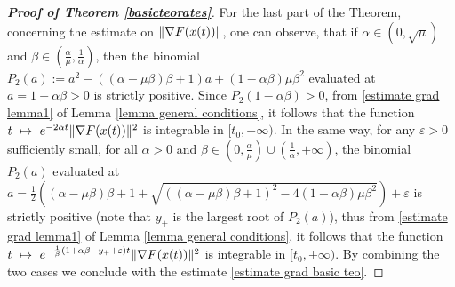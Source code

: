 \documentclass[reqno]{amsart}
\theoremstyle{plain}
\theoremstyle{definition}
\theoremstyle{remark}
\DeclarePairedDelimiter{\norm}{\lVert}{\rVert}	%
\newcommand{\Rb}{\mathcal{R}}
\begin{document}
\begin{proof}[\textbf{Proof of Theorem \ref{basicteorates}}]
For the last part of the Theorem, concerning the estimate on $\norm{\nabla F(x(t))}$, one can observe, that if $\alpha \in (0,\sqrt{\mu})$ and $\beta\in \left(\frac{\alpha}{\mu},\frac{1}{\alpha}\right)$, then the binomial $P_{2}(a):= a^2 - \left((\alpha-\mu\beta)\beta +1\right)a + (1-\alpha\beta)\mu\beta^{2}$ evaluated at $a=1-\alpha\beta>0$ is strictly positive. Since $P_{2}(1-\alpha\beta)>0$, from \eqref{estimate grad lemma1} of Lemma \ref{lemma general conditions}, it follows that the function $t~\mapsto ~ e^{-2\alpha t}\norm{\nabla F(x(t))}^{2}$ is integrable in $[t_{0},+\infty)$. In the same way, for any $\varepsilon>0$ sufficiently small, for all $\alpha>0$ and $\beta\in\left(0,\frac{\alpha}{\mu}\right)\cup\left(\frac{1}{\alpha},+\infty\right)$, the binomial $P_{2}(a)$ evaluated at $a=\frac{1}{2}\left((\alpha-\mu\beta)\beta+1 + \sqrt{\left((\alpha-\mu\beta)\beta+1\right)^{2}-4(1-\alpha\beta)\mu\beta^{2}}\right)+\varepsilon$ is strictly positive (note that $y_{+}$ is the largest root of $P_{2}(a)$), thus from \eqref{estimate grad lemma1} of Lemma \ref{lemma general conditions}, it follows that the function $t~\mapsto ~ e^{-\frac{1}{\beta}(1+\alpha\beta-y_{+}+\varepsilon)t}\norm{\nabla F(x(t))}^{2}$ is integrable in $[t_{0},+\infty)$. By combining the two cases we conclude with the estimate \eqref{estimate grad basic teo}.
\end{proof}
\end{document}
